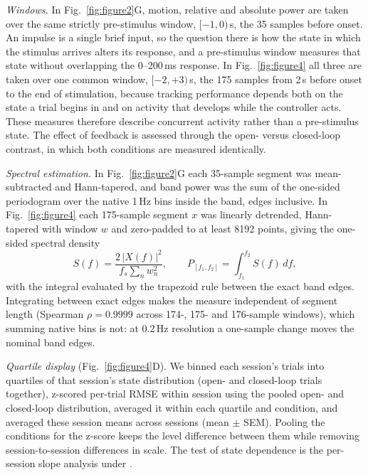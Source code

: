 \emph{Windows.} In Fig.~\ref{fig:figure2}G, motion, relative and absolute power are taken over the same strictly pre-stimulus window, $[-1, 0)$\,s, the 35 samples before onset.
An impulse is a single brief input, so the question there is how the state in which the stimulus arrives alters its response, and a pre-stimulus window measures that state without overlapping the 0--200\,ms response.
In Fig.~\ref{fig:figure4} all three are taken over one common window, $[-2, +3)$\,s, the 175 samples from 2\,s before onset to the end of stimulation, because tracking performance depends both on the state a trial begins in and on activity that develops while the controller acts.
These measures therefore describe concurrent activity rather than a pre-stimulus state.
The effect of feedback is assessed through the open- versus closed-loop contrast, in which both conditions are measured identically.

\emph{Spectral estimation.} In Fig.~\ref{fig:figure2}G each 35-sample segment was mean-subtracted and Hann-tapered, and band power was the sum of the one-sided periodogram over the native 1\,Hz bins inside the band, edges inclusive.
In Fig.~\ref{fig:figure4} each 175-sample segment $x$ was linearly detrended, Hann-tapered with window $w$ and zero-padded to at least 8192 points, giving the one-sided spectral density
%
\begin{equation}
    S(f) = \frac{2\,\lvert X(f) \rvert^{2}}{f_{s} \sum_{n} w_{n}^{2}},
    \qquad
    P_{[f_1, f_2]} = \int_{f_1}^{f_2} S(f)\,df ,
    \label{eq:bandpow}
\end{equation}
%
with the integral evaluated by the trapezoid rule between the exact band edges.
Integrating between exact edges makes the measure independent of segment length (Spearman $\rho = 0.9999$ across 174-, 175- and 176-sample windows), which summing native bins is not: at 0.2\,Hz resolution a one-sample change moves the nominal band edges.

\emph{Quartile display} (Fig.~\ref{fig:figure4}D).
We binned each session's trials into quartiles of that session's state distribution (open- and closed-loop trials together), z-scored per-trial RMSE within session using the pooled open- and closed-loop distribution, averaged it within each quartile and condition, and averaged these session means across sessions (mean $\pm$ SEM).
Pooling the conditions for the z-score keeps the level difference between them while removing session-to-session differences in scale.
The test of state dependence is the per-session slope analysis under .

